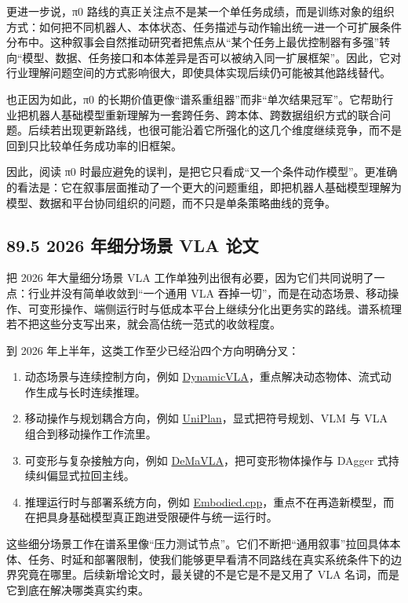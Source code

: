 更进一步说，π0 路线的真正关注点不是某一个单任务成绩，而是训练对象的组织方式：如何把不同机器人、本体状态、任务描述与动作输出统一进一个可扩展条件分布中。这种叙事会自然推动研究者把焦点从“某个任务上最优控制器有多强”转向“模型、数据、任务接口和本体差异是否可以被纳入同一扩展框架”。因此，它对行业理解问题空间的方式影响很大，即使具体实现后续仍可能被其他路线替代。

也正因为如此，π0 的长期价值更像“谱系重组器”而非“单次结果冠军”。它帮助行业把机器人基础模型重新理解为一套跨任务、跨本体、跨数据组织方式的联合问题。后续若出现更新路线，也很可能沿着它所强化的这几个维度继续竞争，而不是回到只比较单任务成功率的旧框架。

因此，阅读 π0 时最应避免的误判，是把它只看成“又一个条件动作模型”。更准确的看法是：它在叙事层面推动了一个更大的问题重组，即把机器人基础模型理解为模型、数据和平台协同组织的问题，而不只是单条策略曲线的竞争。

\subsection*{89.5 2026 年细分场景 VLA 论文}


把 2026 年大量细分场景 VLA 工作单独列出很有必要，因为它们共同说明了一点：行业并没有简单收敛到“一个通用 VLA 吞掉一切”，而是在动态场景、移动操作、可变形操作、端侧运行时与低成本平台上继续分化出更务实的路线。谱系梳理若不把这些分支写出来，就会高估统一范式的收敛程度。

到 2026 年上半年，这类工作至少已经沿四个方向明确分叉：

\begin{enumerate}
\item 动态场景与连续控制方向，例如 \href{https://arxiv.org/abs/2605.31286}{DynamicVLA}，重点解决动态物体、流式动作生成与长时连续推理。
\item 移动操作与规划耦合方向，例如 \href{https://arxiv.org/abs/2604.15049}{UniPlan}，显式把符号规划、VLM 与 VLA 组合到移动操作工作流里。
\item 可变形与复杂接触方向，例如 \href{https://arxiv.org/abs/2602.19201}{DeMaVLA}，把可变形物体操作与 DAgger 式持续纠偏显式拉回主线。
\item 推理运行时与部署系统方向，例如 \href{https://arxiv.org/abs/2607.00556}{Embodied.cpp}，重点不在再造新模型，而在把具身基础模型真正跑进受限硬件与统一运行时。
\end{enumerate}

这些细分场景工作在谱系里像“压力测试节点”。它们不断把“通用叙事”拉回具体本体、任务、时延和部署限制，使我们能够更早看清不同路线在真实系统条件下的边界究竟在哪里。后续新增论文时，最关键的不是它是不是又用了 VLA 名词，而是它到底在解决哪类真实约束。

